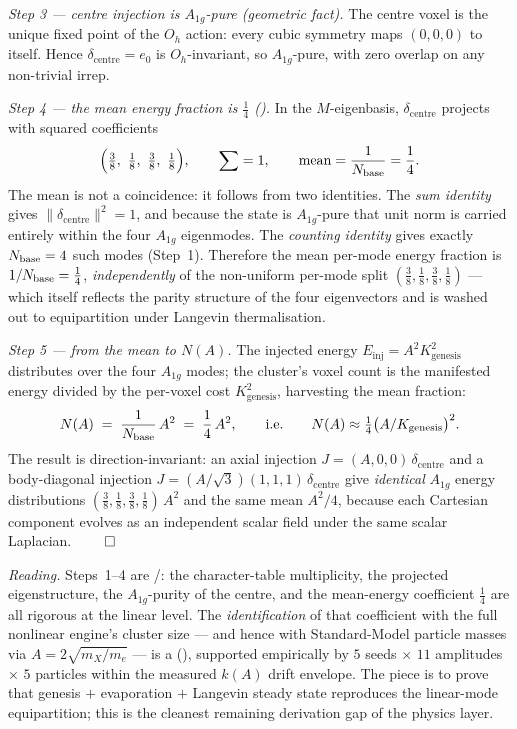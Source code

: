 \emph{Step 3 --- centre injection is $A_{1g}$-pure (geometric fact).} The centre
voxel is the unique fixed point of the $O_h$ action: every cubic symmetry maps
$(0,0,0)$ to itself. Hence $\delta_{\text{centre}} = e_0$ is $O_h$-invariant, so
$A_{1g}$-pure, with zero overlap on any non-trivial irrep.

\emph{Step 4 --- the mean energy fraction is $\tfrac14$ ().} In the
$M$-eigenbasis, $\delta_{\text{centre}}$ projects with squared coefficients
\[
  \Bigl(\tfrac38,\ \tfrac18,\ \tfrac38,\ \tfrac18\Bigr),
  \qquad \sum = 1,
  \qquad \text{mean} = \frac{1}{\Nbase} = \frac14 .
\]
The mean is not a coincidence: it follows from two identities. The
\emph{sum identity} gives $\|\delta_{\text{centre}}\|^2 = 1$, and because the
state is $A_{1g}$-pure that unit norm is carried entirely within the four
$A_{1g}$ eigenmodes. The \emph{counting identity} gives exactly $N_{\mathrm{base}} = 4$ such
modes (Step~1). Therefore the mean per-mode energy fraction is $1/N_{\mathrm{base}} = \tfrac14$,
\emph{independently} of the non-uniform per-mode split $(\tfrac38,\tfrac18,
\tfrac38,\tfrac18)$ --- which itself reflects the parity structure of the four
eigenvectors and is washed out to equipartition under Langevin thermalisation.

\emph{Step 5 --- from the mean to $N(A)$.} The injected energy
$E_{\mathrm{inj}} = A^2 K_{\mathrm{genesis}}^2$ distributes over the four $A_{1g}$
modes; the cluster's voxel count is the manifested energy divided by the per-voxel
cost $K_{\mathrm{genesis}}^2$, harvesting the mean fraction:
\[
  N(A) \;=\; \frac{1}{N_{\mathrm{base}}}\,A^2 \;=\; \frac14\,A^2,
  \qquad\text{i.e.}\qquad N(A)\approx \tfrac14\bigl(A/K_{\mathrm{genesis}}\bigr)^2 .
\]
The result is direction-invariant: an axial injection $J = (A,0,0)\,\delta_{\text{centre}}$
and a body-diagonal injection $J = (A/\sqrt3)(1,1,1)\,\delta_{\text{centre}}$ give
\emph{identical} $A_{1g}$ energy distributions $(\tfrac38,\tfrac18,\tfrac38,\tfrac18)\,A^2$
and the same mean $A^2/4$, because each Cartesian component evolves as an
independent scalar field under the same scalar Laplacian. \hfill$\qed$

\emph{Reading.} Steps~1--4 are /: the character-table
multiplicity, the projected eigenstructure, the $A_{1g}$-purity of the centre, and
the mean-energy coefficient $\tfrac14$ are all rigorous at the linear level. The
\emph{identification} of that coefficient with the full nonlinear engine's cluster
size --- and hence with Standard-Model particle masses via $A = 2\sqrt{m_X/m_e}$
--- is a  (), supported empirically by $5$ seeds $\times$ $11$
amplitudes $\times$ $5$ particles within the measured $k(A)$ drift envelope. The
 piece is to prove that genesis $+$ evaporation $+$ Langevin steady state
reproduces the linear-mode equipartition; this is the cleanest remaining derivation
gap of the physics layer.

